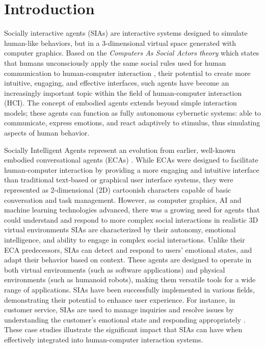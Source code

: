 \documentclass[12pt]{article}
\begin{document}
\newpage

\section{Introduction}

Socially interactive agents (SIAs) \cite{lugrin2022handbook}
are interactive systems designed to simulate human-like behaviors, but in a 3-dimensional virtual space generated with computer graphics.
Based on the {\em Computers As Social Actors   theory} which states that humans unconsciously apply the same social rules used for human communication to human-computer interaction \cite{Nass1996}, their potential to create more intuitive, engaging, and effective interfaces, such agents have become an increasingly important topic within the field of human-computer interaction (HCI).  The concept of embodied agents extends beyond simple interaction models; these agents can function as fully autonomous cybernetic systems: able to communicate, express emotions, and react adaptively to stimulus, thus simulating aspects of human behavior.  

{Socially Intelligent Agents} represent an evolution from earlier, well-known embodied conversational agents (ECAs) \cite{Cassell2000}.  While ECAs were designed to facilitate human-computer interaction by providing a more engaging and intuitive interface than traditional text-based or graphical user interface  systems, they were represented as 2-dimensional (2D)  cartoonish characters capable of basic conversation and task management. However, as computer graphics, AI and machine learning technologies advanced, there was a growing need for agents that could understand and respond to more complex social interactions in realistic 3D virtual environments \cite{lugrin2022handbook}
SIAs are characterized by their autonomy, emotional intelligence, and ability to engage in complex social interactions. Unlike their ECA predecessors, SIAs can detect and respond to users' emotional states, and adapt their behavior based on context. These agents are designed to operate in both virtual environments (such as software applications) and physical environments (such as humanoid robots), making them versatile tools for a wide range of applications.
SIAs have been successfully implemented in various fields, demonstrating their potential to enhance user experience. For instance, in customer service, SIAs are used to manage inquiries and resolve issues by understanding the customer's emotional state and responding appropriately \cite{Gratch2021SIArapport}.  These case studies illustrate the significant impact that SIAs can have when effectively integrated into human-computer interaction systems.
\end{document}
